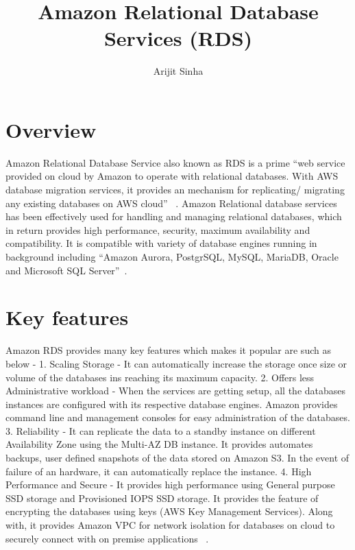 
\title{Amazon Relational Database Services (RDS)}


\author{Arijit Sinha}


\renewcommand{\shortauthors}{A.Sinha}


\maketitle

\section{Overview}

Amazon Relational Database Service also known as RDS is a prime ``web service 
provided on cloud by Amazon to operate with relational databases. 
With AWS database migration services, it provides an mechanism for 
replicating/ migrating any existing databases on AWS cloud''
~\cite{hid-sp18-520-amazonrds}.
Amazon Relational database services has been effectively used for  handling
and managing relational databases, which in return provides high performance, 
security, maximum availability and compatibility. 
It is compatible with variety of database engines running in background 
including ``Amazon Aurora, PostgrSQL, MySQL, MariaDB, Oracle and 
Microsoft SQL Server''~\cite{hid-sp18-520-amazonrds}.

\section{Key features}

Amazon RDS provides many key features which makes it popular are such as below - 
1. Scaling Storage - It can automatically increase the storage once size or 
volume of the databases ins reaching its maximum capacity.
2. Offers less Administrative workload - When the services are getting setup, 
all the databases instances are configured with its respective database engines. 
Amazon provides command line and management consoles for easy administration 
of the databases.
3. Reliability - It can replicate the data to a standby instance on different 
Availability Zone using the Multi-AZ DB instance. It provides  automates backups, 
user defined snapshots of the data stored on Amazon S3. In the event of failure 
of an hardware, it can automatically replace the instance.
4. High Performance and Secure -  It provides high performance using General 
purpose SSD storage and Provisioned IOPS SSD storage. It provides the feature of 
encrypting the databases using keys (AWS Key Management Services). Along with, it 
provides Amazon VPC for network isolation for databases on cloud to securely 
connect with on premise applications
~\cite{hid-sp18-520-amazonrds}.
 

